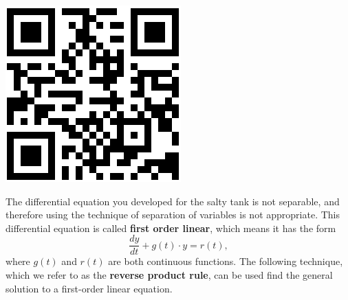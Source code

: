 \vspace{-.5in}\hspace{-.1in}\includegraphics[width=.5in]{04/04SaltyTankQR.png}
\vfill

\clearpage
 
The differential equation you developed for the salty tank is not separable, and therefore using the technique of separation of variables is not appropriate. This differential equation is  called \textbf{first order linear}, which means it has the form 
\[\frac{dy}{dt}+ g(t) \cdot y=r(t),\]
where $g(t)$ and $r(t)$ are both continuous functions. 
\vs
The following technique, which we refer to as the \textbf{reverse product rule}, can be used find the general solution to a first-order linear equation.

